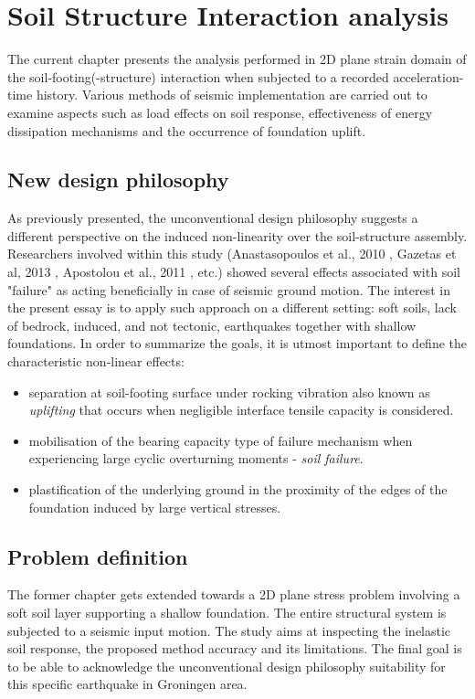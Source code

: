 	\chapter{Soil Structure Interaction analysis} \label{ch6}
	
	The current chapter presents the analysis performed in 2D plane strain domain of the soil-footing(-structure) interaction when subjected to a recorded acceleration-time history. Various methods of seismic implementation are carried out to examine aspects such as load effects on soil response, effectiveness of energy dissipation mechanisms and the occurrence of foundation uplift.
	
	\section{New design philosophy}
	As previously presented, the unconventional design philosophy suggests a different perspective on the induced non-linearity over the soil-structure assembly. Researchers involved within this study (Anastasopoulos et al., 2010 \cite{anastasopoulos2010soil}, Gazetas et al, 2013 \cite{gazetas2013nonlinear}, Apostolou et al., 2011 \cite{apostolou2011soil}, etc.) showed \mbox{several} effects associated with soil "failure" as acting beneficially in case of seismic ground motion. The interest in the present essay is to apply such approach on a different setting: soft soils, lack of bedrock, induced, and not tectonic, earthquakes together with shallow foundations. In order to summarize the goals, it is utmost important to define the characteristic non-linear effects:
	\begin{itemize}
		\item separation at soil-footing surface under rocking vibration also known as \textit{uplifting} that occurs when negligible interface tensile capacity is considered.
		\item mobilisation of the bearing capacity type of failure mechanism  when experiencing large cyclic overturning moments - \textit{soil failure}.
		\item plastification of the underlying ground in the proximity of the edges of the foundation \mbox{induced} by large vertical stresses.
	\end{itemize} 
	
	\section{Problem definition}
	The former chapter gets extended towards a 2D plane stress problem involving a soft soil layer supporting a shallow foundation. The entire structural system is subjected to a seismic input motion. The study aims at inspecting the inelastic soil response, the proposed method accuracy and its limitations. The final goal is to be able to acknowledge the unconventional design philosophy suitability for this specific earthquake in Groningen area.
	
